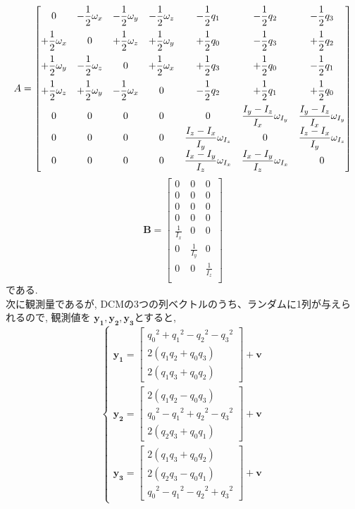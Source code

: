 \documentclass[dvipdfmx, fleqn, uplatex, a4paper]{jsarticle}
\begin{document}
\begin{equation}
 A
  =
  \begin{bmatrix}
    0 & -\displaystyle \frac{1}{2} \omega_{x} & -\displaystyle \frac{1}{2} \omega_{y} & -\displaystyle \frac{1}{2} \omega_{z} &
    -\displaystyle \frac{1}{2} q_{1} & -\displaystyle \frac{1}{2} q_{2} & -\displaystyle \frac{1}{2} q_{3} \\[3mm]
    +\displaystyle \frac{1}{2} \omega_{x} & 0 & +\displaystyle \frac{1}{2} \omega_{z} & +\displaystyle \frac{1}{2} \omega_{y} &
    +\displaystyle \frac{1}{2} q_{0} & -\displaystyle \frac{1}{2} q_{3} & +\displaystyle \frac{1}{2} q_{2} \\[3mm]
    +\displaystyle \frac{1}{2} \omega_{y} & -\displaystyle \frac{1}{2} \omega_{z} & 0 & +\displaystyle \frac{1}{2} \omega_{x} &
    +\displaystyle \frac{1}{2} q_{3} & +\displaystyle \frac{1}{2} q_{0} & -\displaystyle \frac{1}{2} q_{1} \\[3mm]
    +\displaystyle \frac{1}{2} \omega_{z} & +\displaystyle \frac{1}{2} \omega_{y} & -\displaystyle \frac{1}{2} \omega_{x} & 0 &
    -\displaystyle \frac{1}{2} q_{2} & +\displaystyle \frac{1}{2} q_{1} & +\displaystyle \frac{1}{2} q_{0} \\[3mm]
    0 & 0 & 0 & 0 & 0 & \displaystyle \frac{I_{y}-I_{z}}{I_{x}} \omega_{I_{y}} & \displaystyle \frac{I_{y}-I_{z}}{I_{x}} \omega_{I_{y}} \\
    0 & 0 & 0 & 0 & \displaystyle \frac{I_{z}-I_{x}}{I_{y}} \omega_{I_{z}} & 0 & \displaystyle \frac{I_{z}-I_{x}}{I_{y}} \omega_{I_{z}} \\
    0 & 0 & 0 & 0 & \displaystyle \frac{I_{x}-I_{y}}{I_{z}} \omega_{I_{x}} & \displaystyle \frac{I_{x}-I_{y}}{I_{z}} \omega_{I_{x}} & 0
  \end{bmatrix}
\end{equation}
\begin{equation}
  \bm{B} =
  \begin{bmatrix}
    0 & 0 & 0 \\
    0 & 0 & 0 \\
    0 & 0 & 0 \\
    0 & 0 & 0 \\
    \displaystyle \frac{1}{I_x} & 0 & 0 \\
    0 & \displaystyle \frac{1}{I_y} & 0\\
    0 & 0 & \displaystyle \frac{1}{I_z}\\
  \end{bmatrix}
\end{equation}
である. \\
次に観測量であるが, DCMの3つの列ベクトルのうち、ランダムに1列が与えられるので, 観測値を
$\bm{y_1},\bm{y_2},\bm{y_3}$とすると,
\begin{equation}
  \begin{cases}
    \bm{y_1} =
    \begin{bmatrix}
      {q_0}^2 + {q_1}^2 - {q_2}^2 - {q_3}^2 \\
      2(q_1q_2 + q_0q_3) \\
      2(q_1q_3 + q_0q_2)
    \end{bmatrix}
    + \bm{v} \\
    \bm{y_2} =
    \begin{bmatrix}
      2(q_1q_2 - q_0q_3) \\
      {q_0}^2 - {q_1}^2 + {q_2}^2 - {q_3}^2 \\
      2(q_2q_3 + q_0q_1)
    \end{bmatrix}
    + \bm{v} \\
    \bm{y_3} =
    \begin{bmatrix}
      2(q_1q_3 + q_0q_2) \\
      2(q_2q_3 - q_0q_1) \\
      {q_0}^2 - {q_1}^2 - {q_2}^2 + {q_3}^2
    \end{bmatrix}
    + \bm{v}
  \end{cases}
\end{equation}
\end{document}
